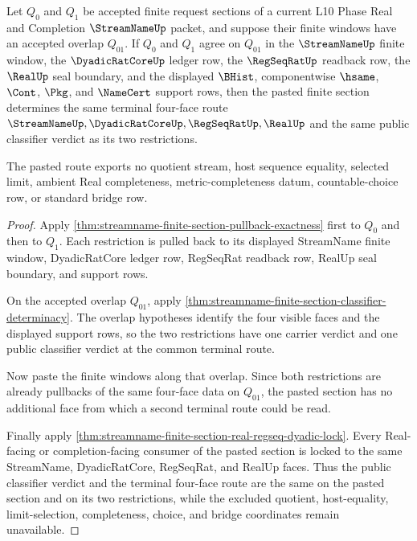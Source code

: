 \begin{theorem}
\label{thm:streamname-finite-section-pasting-exactness}
Let $Q_0$ and $Q_1$ be accepted finite request sections of a current L10
Phase Real and Completion $\StreamNameUp$ packet, and suppose their finite
windows have an accepted overlap $Q_{01}$. If $Q_0$ and $Q_1$ agree on
$Q_{01}$ in the $\StreamNameUp$ finite window, the $\DyadicRatCoreUp$ ledger
row, the $\RegSeqRatUp$ readback row, the $\RealUp$ seal boundary, and the
displayed $\BHist$, componentwise $\hsame$, $\Cont$, $\Pkg$, and $\NameCert$
support rows, then the pasted finite section determines the same terminal
four-face route
$\StreamNameUp,\DyadicRatCoreUp,\RegSeqRatUp,\RealUp$ and the same public
classifier verdict as its two restrictions.

The pasted route exports no quotient stream, host sequence equality, selected
limit, ambient Real completeness, metric-completeness datum, countable-choice
row, or standard bridge row.
\end{theorem}
\begin{proof}
Apply \autoref{thm:streamname-finite-section-pullback-exactness} first to
$Q_0$ and then to $Q_1$. Each restriction is pulled back to its displayed
StreamName finite window, DyadicRatCore ledger row, RegSeqRat readback row,
RealUp seal boundary, and support rows.

On the accepted overlap $Q_{01}$, apply
\autoref{thm:streamname-finite-section-classifier-determinacy}. The overlap
hypotheses identify the four visible faces and the displayed support rows, so
the two restrictions have one carrier verdict and one public classifier
verdict at the common terminal route.

Now paste the finite windows along that overlap. Since both restrictions are
already pullbacks of the same four-face data on $Q_{01}$, the pasted section
has no additional face from which a second terminal route could be read.

Finally apply \autoref{thm:streamname-finite-section-real-regseq-dyadic-lock}.
Every Real-facing or completion-facing consumer of the pasted section is
locked to the same StreamName, DyadicRatCore, RegSeqRat, and RealUp faces.
Thus the public classifier verdict and the terminal four-face route are the
same on the pasted section and on its two restrictions, while the excluded
quotient, host-equality, limit-selection, completeness, choice, and bridge
coordinates remain unavailable.
\end{proof}

